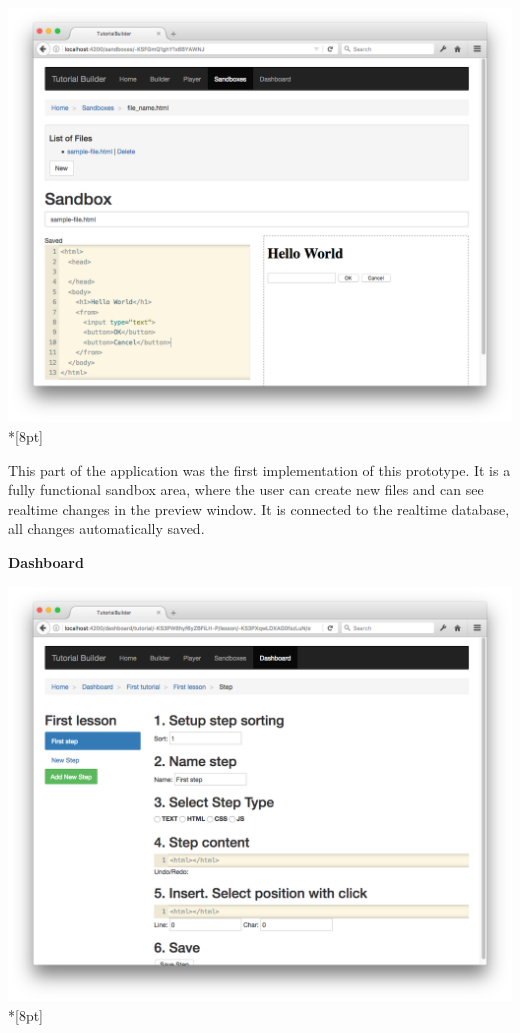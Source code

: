 \documentclass[12pt, a4paper, oneside, openright, medskipamount]{report}
\begin{document}
\includegraphics[width=1\textwidth]{assets/tour-screenshots/the-sandbox.png}\\*[8pt]

This part of the application was the first implementation of this prototype. It is a fully functional sandbox area, where the user can create new files and can see realtime changes in the preview window. It is connected to the realtime database, all changes automatically saved.

\newpage

\textbf{Dashboard}

\includegraphics[width=1\textwidth]{assets/tour-screenshots/dashboard.png}\\*[8pt]
\end{document}
